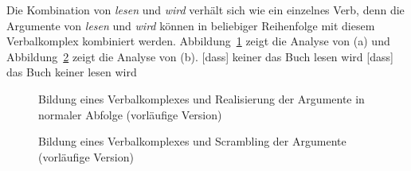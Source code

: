 Die Kombination von \emph{lesen} und \emph{wird} verhält sich wie ein einzelnes Verb, denn die
Argumente von \emph{lesen} und \emph{wird} können in beliebiger Reihenfolge mit diesem Verbalkomplex kombiniert werden. Abbildung~\ref{fig-vc-nom-acc} zeigt die Analyse von (a) und
Abbildung~\ref{fig-vc-acc-nom} zeigt die Analyse von (b).
\eal
\ex\label{ex-dass-keiner-das-buch-lesen-wird}
{[}dass{]} keiner das Buch lesen wird
\ex
{[}dass{]} das Buch keiner lesen wird
\zl

\begin{figure}
\caption{\label{fig-vc-nom-acc}Bildung eines Verbalkomplexes und Realisierung der Argumente in normaler
  Abfolge (vorläufige Version)}
\end{figure}




\begin{figure}
\caption{\label{fig-vc-acc-nom}Bildung eines Verbalkomplexes und Scrambling der Argumente (vorläufige Version)}
\end{figure}

